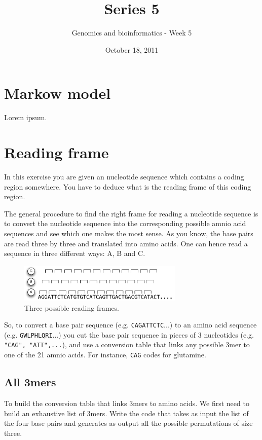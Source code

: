 \documentclass[a4paper,11pt]{article}
\title{Series 5}
\date{October 18, 2011}
\author{Genomics and bioinformatics - Week 5}
\begin{document}
\maketitle

\section{Markow model}
Lorem ipsum.

\section{Reading frame}
In this exercise you are given an nucleotide sequence which contains a coding region somewhere. You have to deduce what is the reading frame of this coding region.

The general procedure to find the right frame for reading a nucleotide sequence is to convert the nucleotide sequence into the corresponding possible amnio acid sequences and see which one makes the most sense. As you know, the base pairs are read three by three and translated into amino acids. One can hence read a sequence in three different ways: A, B and C.

\begin{figure}[h!]
	\centering
	\includegraphics[width=0.7\textwidth]{reading_frame.pdf}
	\caption{Three possible reading frames.}
	\label{fig:gene_distribution_rib}
\end{figure}

So, to convert a base pair sequence (e.g. \texttt{CAGATTCTC}...) to an amino acid sequence (e.g. \texttt{GWLPHLQRI}...) you cut the base pair sequence in pieces of 3 nucleotides (e.g. \texttt{"CAG", "ATT",...}), and use a conversion table that links any possible 3mer to one of the 21 amnio acids. For instance, \texttt{CAG} codes for glutamine.

\subsection{All 3mers}
To build the conversion table that links 3mers to amino acids. We first need to build an exhaustive list of 3mers. Write the code that takes as input the list of the four base pairs and generates as output all the possible permutations of size three.
	
\end{document}
